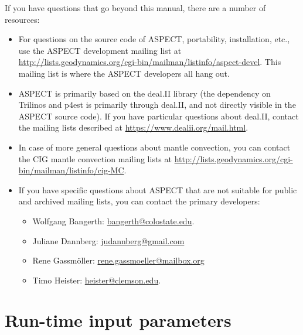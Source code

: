 \documentclass{article}
\newcommand{\aspect}{\textsc{ASPECT}}
\begin{document}
If you have questions that go beyond this manual, there are a number of
resources:
\begin{itemize}
\item For questions on the source code of \aspect{}, portability, installation,
  etc., use the \aspect{} development mailing list at
  \url{http://lists.geodynamics.org/cgi-bin/mailman/listinfo/aspect-devel}. This
  mailing list is where the \aspect{} developers all hang out.

\item \aspect{} is primarily based on the deal.II library (the dependency
  on Trilinos and p4est is primarily through deal.II, and not directly
  visible in the \aspect{} source code). If you have particular questions
  about deal.II, contact
  the mailing lists described at \url{https://www.dealii.org/mail.html}.

\item In case of more general questions about mantle convection, you can
  contact the CIG mantle
  convection mailing lists at 
  \url{http://lists.geodynamics.org/cgi-bin/mailman/listinfo/cig-MC}.

\item If you have specific questions about \aspect{} that are not suitable
  for public and archived mailing lists, you can contact the
  primary developers:
  \begin{itemize}
  \item Wolfgang
    Bangerth: \url{bangerth@colostate.edu}.
  \item Juliane
    Dannberg: \url{judannberg@gmail.com}
  \item Rene
    Gassm{\"o}ller: \url{rene.gassmoeller@mailbox.org}
  \item Timo
    Heister: \url{heister@clemson.edu}.
  \end{itemize}
\end{itemize}


\appendix

\section{Run-time input parameters}
\label{sec:parameters}




\pagebreak

\end{document}
